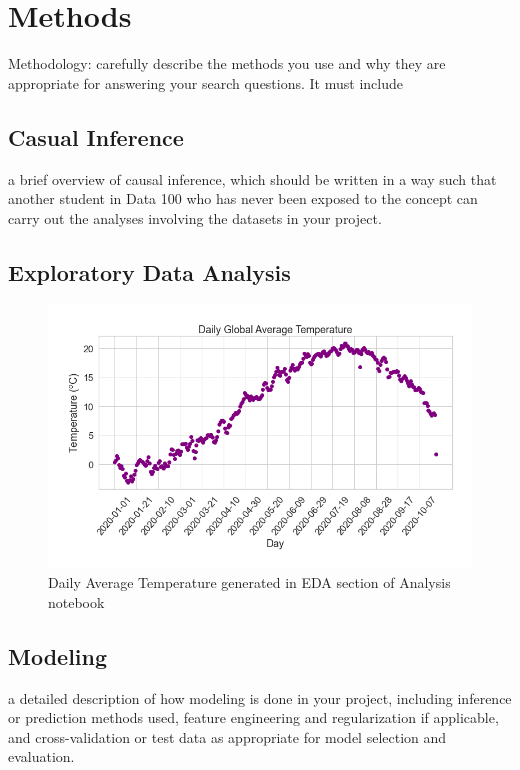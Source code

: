 \section{Methods}
Methodology: carefully describe the methods you use and why they are appropriate for answering your search questions. It must include
\subsection{Casual Inference}
a brief overview of causal inference, which should be written in a way such that another student in Data 100 who has never been exposed to the concept can carry out the analyses involving the datasets in your project.
\subsection{Exploratory Data Analysis}
\begin{figure}
    \centering
    \includegraphics[width=\columnwidth]{figures/DailyAveTemp.png}
    \caption{Daily Average Temperature generated in EDA section of Analysis notebook}
    \label{fig:my_label}
\end{figure}
\subsection{Modeling}
a detailed description of how modeling is done in your project, including inference or prediction methods used, feature engineering and regularization if applicable, and cross-validation or test data as appropriate for model selection and evaluation.
